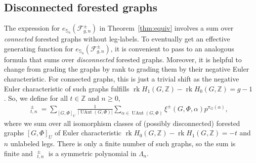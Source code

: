 \documentclass[oneside]{amsart}
\theoremstyle{remark}
\newcommand{\Z}{\mathbb{Z}}
\DeclareMathOperator{\SG}{{\mathbb S}}
\newcommand{\UAut}{{\operatorname{UAut}}}
\DeclareMathOperator{\ee}{\widehat{e}}
\DeclareMathOperator{\rank}{\mathrm{rk}}
\newcommand{\F}{\mathcal{F}}
\begin{document}
\subsection{Disconnected forested graphs}

The expression for $e_{\SG_n}(\F^\pm_{g,n})$ in Theorem~\ref{thm:equiv} involves a sum over \emph{connected} forested graphs without leg-labels. To eventually get an effective generating function for $e_{\SG_n}(\F^\pm_{g,n})$, it is convenient to pass to an analogous formula that sums over \emph{disconnected} forested graphs. 
Moreover, it is helpful to change from grading the graphs by rank to grading them by their negative Euler characteristic. 
For connected graphs, this is just a trivial shift as 
the negative Euler characteristic of such graphs fulfills $\rank H_1(G,\Z) - \rank H_0(G,\Z) = g-1$.
%
So, we define for all $t \in \Z$ and $n \geq 0$,
\begin{align} \label{eq:equiv_disc} \ee_{t,n}^\pm = \sum_{[G,\Phi]_U} \frac{1}{|\UAut(G,\Phi)|} \sum_{\alpha \in \UAut(G,\Phi)} \xi^\pm(G,\Phi,\alpha) p^{\pi_G(\alpha)}, \end{align}
where we sum over all isomorphism classes of (possibly disconnected) forested graphs $[G,\Phi]_U$ of Euler characteristic $\rank H_0(G,\Z) - \rank H_1(G,\Z) = -t$ and $n$ unlabeled legs.
There is only a finite number of such graphs, so the sum is finite and $ \ee_{t,n}^\pm $
is a symmetric polynomial in $\Lambda_n$.
\end{document}
